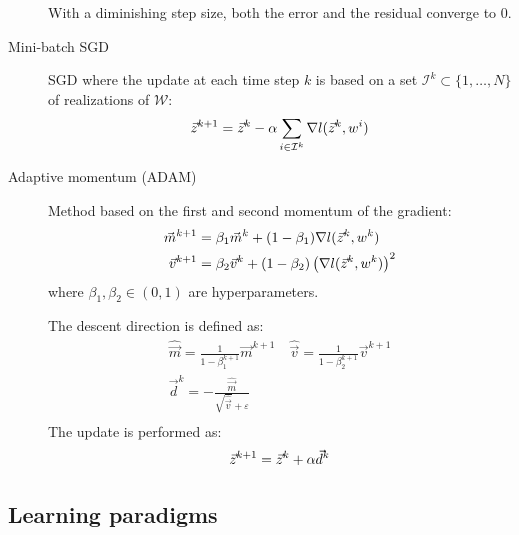 \begin{description}
        \begin{theorem} 
            With a diminishing step size, both the error and the residual converge to $0$.
        \end{theorem}

    \item[Mini-batch SGD] 
        SGD where the update at each time step $k$ is based on a set $\mathcal{I}^k \subset \{ 1, \dots, N \}$ of realizations of $\mathcal{W}$:
        \[ {\vec{z}}^{k+1} = {\vec{z}}^k - \alpha \sum_{i \in \mathcal{I}^k} \nabla l({\vec{z}}^k, w^i) \]

    \item[Adaptive momentum (ADAM)] 
        Method based on the first and second momentum of the gradient:
        \[
            \begin{split}
                \vec{m}^{k+1} &= \beta_1 \vec{m}^k + (1-\beta_1) \nabla l({\vec{z}}^k, w^k) \\
                \vec{v}^{k+1} &= \beta_2 \vec{v}^k + (1-\beta_2) \left( \nabla l({\vec{z}}^k, w^k) \right)^2
            \end{split}
        \]
        where $\beta_1, \beta_2 \in (0, 1)$ are hyperparameters.
        
        The descent direction is defined as:
        \[
            \begin{gathered}
                \hat{\vec{m}} = \frac{1}{1 - \beta_1^{k+1}} \vec{m}^{k+1}
                \quad
                \hat{\vec{v}} = \frac{1}{1 - \beta_2^{k+1}} \vec{v}^{k+1} \\
                \vec{d}^k = - \frac{\hat{\vec{m}}}{\sqrt{\hat{\vec{v}}} + \varepsilon} \\
            \end{gathered}
        \]
        The update is performed as:
        \[ {\vec{z}}^{k+1} = {\vec{z}}^{k} + \alpha \vec{d}^k \]
\end{description}



\subsection{Learning paradigms}

